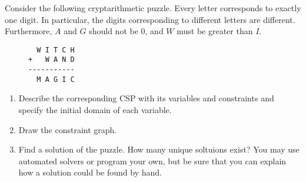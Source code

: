 Consider the following cryptarithmetic puzzle. Every letter corresponds to exactly one digit. In particular, the digits corresponding to different letters are different. Furthermore, $A$ and $G$ should not be $0$, and $W$ must be greater than $I$.

\begin{figure}[h]
\centering
\begin{BVerbatim}
  W I T C H
+   W A N D
-----------
  M A G I C
\end{BVerbatim}
\end{figure}

\begin{enumerate}[label=(\alph*)]
    \item Describe the corresponding CSP with its variables and constraints and specify the initial domain of each variable.
    \item Draw the constraint graph.
    \item Find a solution of the puzzle. How many unique soltuions exist? You may use automated solvers or program your own, but be sure that you can explain how a solution could be found by hand.
\end{enumerate}